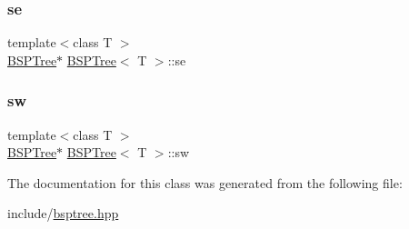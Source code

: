 \subsubsection{\texorpdfstring{se}{se}}
{\footnotesize\ttfamily template$<$class T $>$ \\
\hyperlink{classBSPTree}{B\+S\+P\+Tree}$\ast$ \hyperlink{classBSPTree}{B\+S\+P\+Tree}$<$ T $>$\+::se\hspace{0.3cm}{\ttfamily [private]}}

\mbox{\label{classBSPTree_ae93464ee431a9bfdc211bb622b69342e_ae93464ee431a9bfdc211bb622b69342e}} 
\subsubsection{\texorpdfstring{sw}{sw}}
{\footnotesize\ttfamily template$<$class T $>$ \\
\hyperlink{classBSPTree}{B\+S\+P\+Tree}$\ast$ \hyperlink{classBSPTree}{B\+S\+P\+Tree}$<$ T $>$\+::sw\hspace{0.3cm}{\ttfamily [private]}}



The documentation for this class was generated from the following file\+:\begin{DoxyCompactItemize}
\item 
include/\hyperlink{bsptree_8hpp}{bsptree.\+hpp}\end{DoxyCompactItemize}
